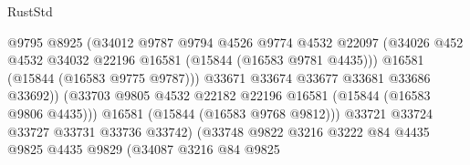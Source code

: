 \begin{lexlean}{RustStd}
\begin{coremodule}
                                            @9795
                                            @8925
                                            (@34012
                                              @9787
                                              @9794
                                              @4526
                                              @9774
                                              @4532
                                              @22097
                                              (@34026
                                                @452
                                                @4532
                                                @34032
                                                @22196
                                                @16581
                                                (@15844 (@16583 @9781 @4435)))
                                              @16581
                                              (@15844 (@16583 @9775 @9787)))
                                            @33671
                                            @33674
                                            @33677
                                            @33681
                                            @33686
                                            @33692))
                                        (@33703
                                          @9805
                                          @4532
                                          @22182
                                          @22196
                                          @16581
                                          (@15844 (@16583 @9806 @4435)))
                                        @16581
                                        (@15844 (@16583 @9768 @9812)))
                                      @33721
                                      @33724
                                      @33727
                                      @33731
                                      @33736
                                      @33742)
                                    (@33748
                                      @9822
                                      @3216
                                      @3222
                                      @84
                                      @4435
                                      @9825
                                      @4435
                                      @9829
                                      (@34087
                                        @3216
                                        @84
                                        @9825

\end{coremodule}
\end{lexlean}
